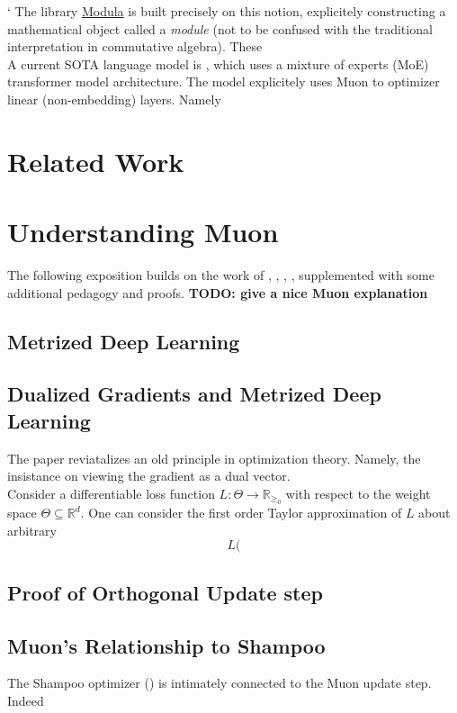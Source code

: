 \documentclass[12pt]{book}
\newcommand{\R}{\mathbb{R}}
\newcommand{\todo}[1]{{\color{red}\bf{TODO: #1}}}
\begin{document}
 `
The library \href{https://github.com/modula-systems/modula}{Modula} is built precisely on this notion, explicitely constructing a mathematical object called a \textit{module} (not to be confused with the traditional interpretation in commutative algebra). These 
\\
A current SOTA language model is \cite{moonshot}, which uses a  mixture of experts (MoE) transformer model architecture. The model explicitely uses Muon to optimizer linear (non-embedding) layers. Namely
\\
\section{Related Work}
\section{Understanding Muon}
The following exposition builds on the work of \cite{bernstein2024modulardualitydeeplearning}, \cite{bernstein2024oldoptimizernewnorm}, \cite{bernstein2025deriving}, \cite{jordan2024muon}, \cite{pethick2025trainingdeeplearningmodels} supplemented with some additional pedagogy and proofs.
\todo{give a nice Muon explanation}
\\

\subsection{Metrized Deep Learning}

\subsection{Dualized Gradients and Metrized Deep Learning}
The paper \cite{bernstein2024modulardualitydeeplearning} reviatalizes an old principle in optimization theory. Namely, the insistance on viewing the gradient as a dual vector. \\
Consider a differentiable loss function $L:\Theta \to \R_{\ge_0}$ with respect to the weight space $\Theta \subseteq \R^{d}$. One can consider the first order Taylor approximation of $L$ about arbitrary
\[
 L(
\]
\subsection{Proof of Orthogonal Update step}
\subsection{Muon's Relationship to Shampoo}
The Shampoo optimizer (\cite{gupta2018shampoopreconditionedstochastictensor}) is intimately connected to the Muon update step. 
\\ 
Indeed 
\end{document}
